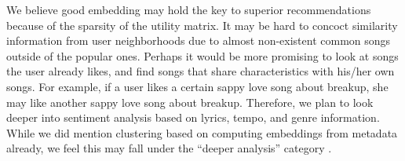 \documentclass[conference]{IEEEtran}
\begin{document}
We believe good embedding may hold the key to superior recommendations because of the sparsity of the utility matrix. It may be hard to concoct similarity information from user neighborhoods due to almost non-existent common songs outside of the popular ones. Perhaps it would be more promising to look at songs the user already likes, and find songs that share characteristics with his/her own songs. For example, if a user likes a certain sappy love song about breakup, she may like another sappy love song about breakup. Therefore, we plan to look deeper into sentiment analysis based on lyrics, tempo, and genre information. While we did mention clustering based on computing embeddings from metadata already, we feel this may fall under the ``deeper analysis'' category \cite{chen2018combining}.



\end{document}
